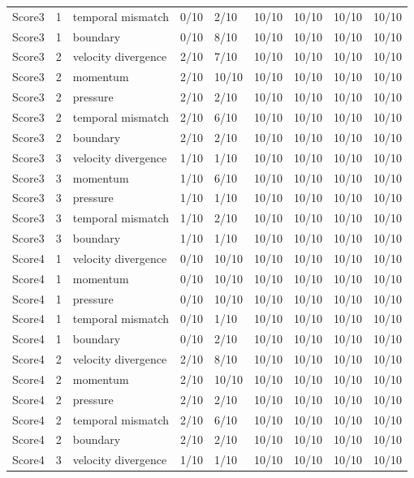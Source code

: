 \begin{longtable}{lllllllll}
Score3 & 1 & temporal mismatch & 0/10 & 2/10 & 10/10 & 10/10 & 10/10 & 10/10 \\
Score3 & 1 & boundary & 0/10 & 8/10 & 10/10 & 10/10 & 10/10 & 10/10 \\
Score3 & 2 & velocity divergence & 2/10 & 7/10 & 10/10 & 10/10 & 10/10 & 10/10 \\
Score3 & 2 & momentum & 2/10 & 10/10 & 10/10 & 10/10 & 10/10 & 10/10 \\
Score3 & 2 & pressure & 2/10 & 2/10 & 10/10 & 10/10 & 10/10 & 10/10 \\
Score3 & 2 & temporal mismatch & 2/10 & 6/10 & 10/10 & 10/10 & 10/10 & 10/10 \\
Score3 & 2 & boundary & 2/10 & 2/10 & 10/10 & 10/10 & 10/10 & 10/10 \\
Score3 & 3 & velocity divergence & 1/10 & 1/10 & 10/10 & 10/10 & 10/10 & 10/10 \\
Score3 & 3 & momentum & 1/10 & 6/10 & 10/10 & 10/10 & 10/10 & 10/10 \\
Score3 & 3 & pressure & 1/10 & 1/10 & 10/10 & 10/10 & 10/10 & 10/10 \\
Score3 & 3 & temporal mismatch & 1/10 & 2/10 & 10/10 & 10/10 & 10/10 & 10/10 \\
Score3 & 3 & boundary & 1/10 & 1/10 & 10/10 & 10/10 & 10/10 & 10/10 \\
Score4 & 1 & velocity divergence & 0/10 & 10/10 & 10/10 & 10/10 & 10/10 & 10/10 \\
Score4 & 1 & momentum & 0/10 & 10/10 & 10/10 & 10/10 & 10/10 & 10/10 \\
Score4 & 1 & pressure & 0/10 & 10/10 & 10/10 & 10/10 & 10/10 & 10/10 \\
Score4 & 1 & temporal mismatch & 0/10 & 1/10 & 10/10 & 10/10 & 10/10 & 10/10 \\
Score4 & 1 & boundary & 0/10 & 2/10 & 10/10 & 10/10 & 10/10 & 10/10 \\
Score4 & 2 & velocity divergence & 2/10 & 8/10 & 10/10 & 10/10 & 10/10 & 10/10 \\
Score4 & 2 & momentum & 2/10 & 10/10 & 10/10 & 10/10 & 10/10 & 10/10 \\
Score4 & 2 & pressure & 2/10 & 2/10 & 10/10 & 10/10 & 10/10 & 10/10 \\
Score4 & 2 & temporal mismatch & 2/10 & 6/10 & 10/10 & 10/10 & 10/10 & 10/10 \\
Score4 & 2 & boundary & 2/10 & 2/10 & 10/10 & 10/10 & 10/10 & 10/10 \\
Score4 & 3 & velocity divergence & 1/10 & 1/10 & 10/10 & 10/10 & 10/10 & 10/10 \\

\end{longtable}
